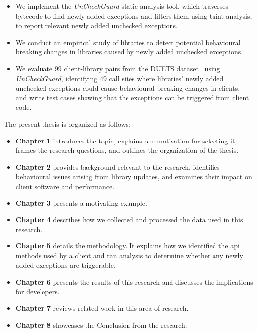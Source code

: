 \begin{itemize}
    \item We implement the \textit{UnCheckGuard} static analysis tool, which traverses bytecode to find newly-added exceptions and filters them using taint analysis, to report relevant newly added unchecked exceptions.
    \item We conduct an empirical study of libraries to detect potential behavioural breaking changes in libraries caused by newly added unchecked exceptions.
    \item We evaluate 99 client-library pairs from the DUETS dataset~\cite{durieux21:_duets} using \textit{UnCheckGuard}, identifying 49 call sites where libraries' newly added unchecked exceptions could cause behavioural breaking changes in clients, and write test cases showing that the exceptions can be triggered from client code.
\end{itemize}

The present thesis is organized as follows:
\begin{itemize}
    \item \textbf{Chapter 1} introduces the topic, explains our motivation for selecting it, frames the research questions, and outlines the organization of the thesis.
    \item \textbf{Chapter 2} provides background relevant to the research, identifies behavioural issues arising from library updates, and examines their impact on client software and performance.
    \item \textbf{Chapter 3} presents a motivating example.
    \item \textbf{Chapter 4} describes how we collected and processed the data used in this research.
    \item \textbf{Chapter 5} details the methodology. It explains how we identified the \gls{api} methods used by a client and ran analysis to determine whether any newly added exceptions are triggerable.
    \item \textbf{Chapter 6} presents the results of this research and discusses the implications for developers.
    \item \textbf{Chapter 7} reviews related work in this area of research.
    \item \textbf{Chapter 8} showcases the Conclusion from the research.
\end{itemize}